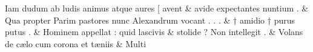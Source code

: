 \documentclass[12pt,onecolumn,twoside,a4paper]{memoir}
\begin{document}
               \begin{pairs}
                  \begin{Leftside}
			\beginnumbering
			\setcounter{stanzaL}{0}
                     
                         \stanza {}Iam
                              dudum
                              ab
                              ludis
                              animus
                              atque
                              aures
                              [
                              avent & 
                     avide
                              expectantes
                              nuntium
                              . \&
                         \stanza {}
                     Qua
                              propter
                              Parim
                              pastores
                              nunc
                              Alexandrum
                              vocant
                              .
                              .
                              . \&
                         \stanza {}
                     †
                              amidio
                              †
                              purus
                              putus
                              . \&
                         \stanza {}Hominem
                              appellat
                              :
                              quid
                              lascivis
                            & 
                     stolide
                              ?
                              Non
                              intellegit
                              . \&
                         \stanza {}
                     Volans
                              de
                              cælo
                              cum
                              corona
                              et
                              tæniis \&
                         \stanza {}Multi

\end{Leftside}
\end{pairs}
\end{document}
